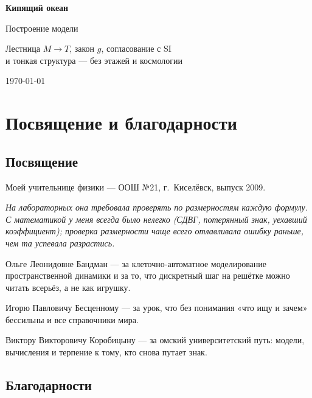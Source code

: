 \begin{titlepage}
  \centering
  \vspace*{2cm}
  {\LARGE\bfseries Кипящий океан\par}
  \vspace{0.6cm}
  {\Large Построение модели\par}
  \vspace{1.0cm}
  {\large Лестница $M\to T$, закон $g$, согласование с SI\\
  и тонкая структура --- без этажей и космологии\par}
  \vspace{1.2cm}
  {\large \bookauthorfullname\par}
  \vfill
  {\large \today\par}
\end{titlepage}

\tableofcontents
\cleardoublepage

\chapter*{Посвящение и благодарности}

\section*{Посвящение}

\noindent
Моей учительнице физики --- ООШ №21, г.~Киселёвск, выпуск 2009.

\medskip
\noindent\itshape
На лабораторных она требовала проверять по размерностям каждую формулу.
С математикой у меня всегда было нелегко (СДВГ, потерянный знак, уехавший коэффициент);
проверка размерности чаще всего отлавливала ошибку раньше, чем та успевала разрастись.
\normalfont

\medskip
\noindent
Ольге Леонидовне Бандман --- за клеточно-автоматное моделирование пространственной динамики
и за то, что дискретный шаг на решётке можно читать всерьёз, а не как игрушку.

\medskip
\noindent
Игорю Павловичу Бесценному --- за урок, что без понимания «что ищу и зачем» бессильны и все справочники мира.

\medskip
\noindent
Виктору Викторовичу Коробицыну --- за омский университетский путь: модели, вычисления
и терпение к тому, кто снова путает знак.

\section*{Благодарности}

